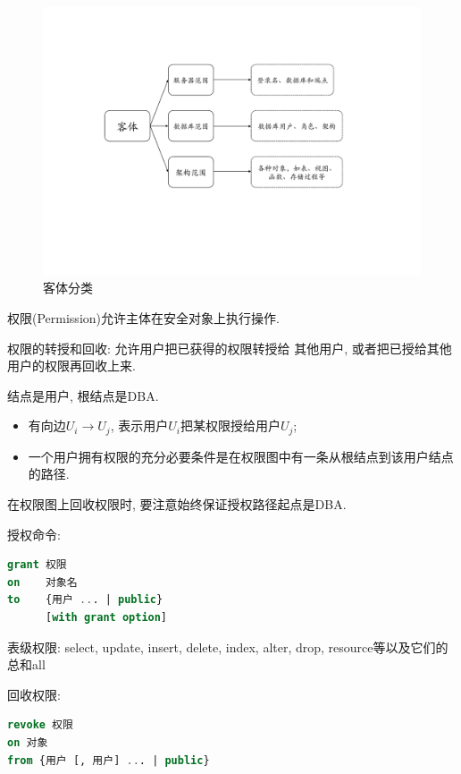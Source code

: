 \begin{figure}[H]
    \centering
    \includegraphics[width=.7\textwidth]{figure/客体.pdf}
    \caption{客体分类}
\end{figure}

\begin{definition}[权限(Permission)]
    权限(Permission)允许主体在安全对象上执行操作.
\end{definition}

\begin{definition}[权限的转授和回收]
    权限的转授和回收: 允许用户把已获得的权限转授给
其他用户, 或者把已授给其他用户的权限再回收上来.
\end{definition}

\begin{definition}[权限图]
    结点是用户, 根结点是DBA.
    \begin{itemize}
        \item 有向边$U_i\to U_j$, 表示用户$U_i$把某权限授给用户$U_j$;
        \item 一个用户拥有权限的充分必要条件是在权限图中有一条从根结点到该用户结点的路径.
    \end{itemize}
\end{definition}

在权限图上回收权限时, 要注意始终保证授权路径起点是DBA.

授权命令:
\begin{lstlisting}[language=SQL]
grant 权限
on    对象名
to    {用户 ... | public}
      [with grant option]
\end{lstlisting}

表级权限: select, update, insert, delete, index, alter, drop, resource等以及它们的总和all

回收权限:
\begin{lstlisting}[language=SQL]
revoke 权限
on 对象
from {用户 [, 用户] ... | public}
\end{lstlisting}

